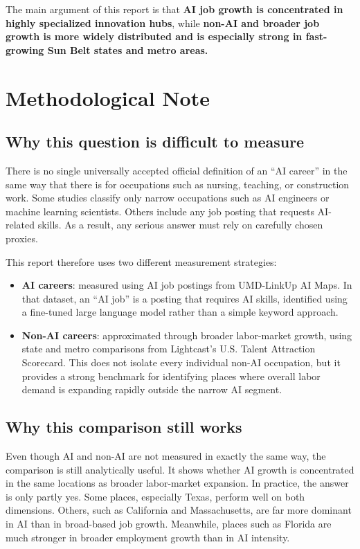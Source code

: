 \documentclass[12pt,a4paper]{article}
\begin{document}
The main argument of this report is that \textbf{AI job growth is concentrated in highly specialized innovation hubs}, while \textbf{non-AI and broader job growth is more widely distributed and is especially strong in fast-growing Sun Belt states and metro areas.}

\section{Methodological Note}

\subsection{Why this question is difficult to measure}

There is no single universally accepted official definition of an ``AI career'' in the same way that there is for occupations such as nursing, teaching, or construction work. Some studies classify only narrow occupations such as AI engineers or machine learning scientists. Others include any job posting that requests AI-related skills. As a result, any serious answer must rely on carefully chosen proxies.

This report therefore uses two different measurement strategies:

\begin{itemize}
    \item \textbf{AI careers}: measured using AI job postings from UMD-LinkUp AI Maps. In that dataset, an ``AI job'' is a posting that requires AI skills, identified using a fine-tuned large language model rather than a simple keyword approach.
    \item \textbf{Non-AI careers}: approximated through broader labor-market growth, using state and metro comparisons from Lightcast's U.S. Talent Attraction Scorecard. This does not isolate every individual non-AI occupation, but it provides a strong benchmark for identifying places where overall labor demand is expanding rapidly outside the narrow AI segment.
\end{itemize}

\subsection{Why this comparison still works}

Even though AI and non-AI are not measured in exactly the same way, the comparison is still analytically useful. It shows whether AI growth is concentrated in the same locations as broader labor-market expansion. In practice, the answer is only partly yes. Some places, especially Texas, perform well on both dimensions. Others, such as California and Massachusetts, are far more dominant in AI than in broad-based job growth. Meanwhile, places such as Florida are much stronger in broader employment growth than in AI intensity.
\end{document}
